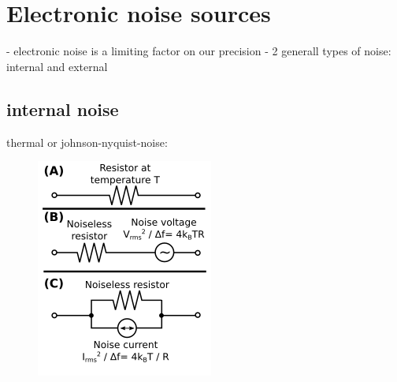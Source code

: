 
\chapter{Electronic noise sources}
\label{sec:noise}

- electronic noise is a limiting factor on our precision
-	2 generall types of noise: internal and external

\section{internal noise}
thermal or johnson-nyquist-noise:
\begin{figure}
	\includegraphics{figs/resistor_noise}
\end{figure}
